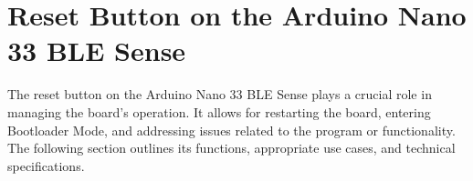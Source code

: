 

\chapter{Reset Button on the Arduino Nano 33 BLE Sense}


The reset button on the Arduino Nano 33 BLE Sense plays a crucial role in managing the board's operation. It allows for restarting the board, entering Bootloader Mode, and addressing issues related to the program or functionality. The following section outlines its functions, appropriate use cases, and technical specifications.



\begin{center}    
	
	
	
\end{center}


